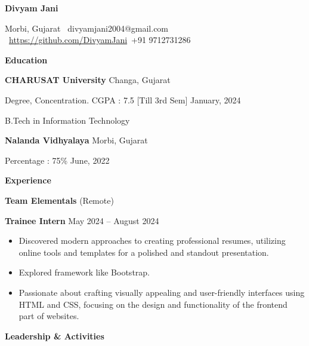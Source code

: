 \documentclass[11pt]{article}
\begin{document}
\begin{center}
    \textbf{Divyam Jani}\\ 
    \hrulefill
\end{center}

\begin{center}
    Morbi, Gujarat \textbullet \ divyamjani2004@gmail.com \textbullet \  \url{https://github.com/DivyamJani}\textbullet \ +91 9712731286
\end{center}

\vspace{0.5pt}

\begin{center}
    \textbf{Education}
\end{center}
\textbf{CHARUSAT University} \hfill Changa, Gujarat

Degree, Concentration. CGPA : 7.5 [Till 3rd Sem] \hfill January, 2024

B.Tech in Information Technology

\vspace{12pt}

\textbf{Nalanda Vidhyalaya} \hfill	Morbi, Gujarat

Percentage : 75\%
\hfill June, 2022 

\vspace{12pt}

\begin{center}
    \textbf{Experience}
\end{center}
\textbf{Team Elementals} \hfill (Remote)

\textbf{Trainee Intern} \hfill May 2024 – August 2024
\begin{itemize}[noitemsep, topsep=0pt, partopsep=0pt, parsep=0pt]
   \item Discovered modern approaches to creating professional resumes, utilizing online tools and templates for a polished and standout presentation.
    \item Explored framework like Bootstrap.
    \item Passionate about crafting visually appealing and user-friendly interfaces using HTML and CSS, focusing on the design and functionality of the frontend part of websites.
\end{itemize}

\vspace{12pt}



\begin{center}
    \textbf{Leadership \& Activities}
\end{center}
\end{document}
